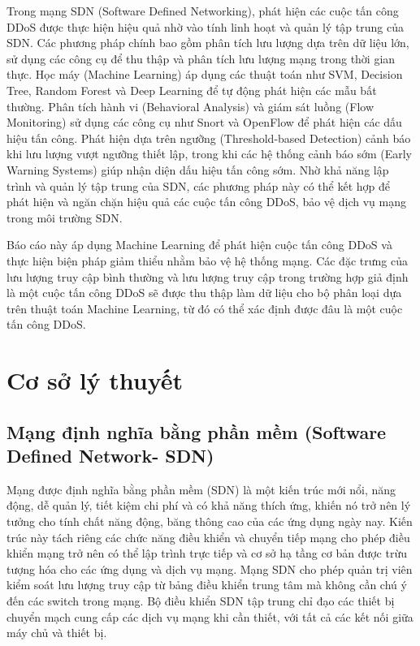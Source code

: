 \documentclass[a4paper]{article}
\begin{document}
Trong mạng SDN (Software Defined Networking), phát hiện các cuộc tấn công DDoS được thực hiện hiệu quả nhờ vào tính linh hoạt và quản lý tập trung của SDN. Các phương pháp chính bao gồm phân tích lưu lượng dựa trên dữ liệu lớn, sử dụng các công cụ để thu thập và phân tích lưu lượng mạng trong thời gian thực. Học máy (Machine Learning) áp dụng các thuật toán như SVM, Decision Tree, Random Forest và Deep Learning để tự động phát hiện các mẫu bất thường. Phân tích hành vi (Behavioral Analysis) và giám sát luồng (Flow Monitoring) sử dụng các công cụ như Snort và OpenFlow để phát hiện các dấu hiệu tấn công. Phát hiện dựa trên ngưỡng (Threshold-based Detection\cite{halman2024threshold}) cảnh báo khi lưu lượng vượt ngưỡng thiết lập, trong khi các hệ thống cảnh báo sớm (Early Warning Systems) giúp nhận diện dấu hiệu tấn công sớm. Nhờ khả năng lập trình và quản lý tập trung của SDN, các phương pháp này có thể kết hợp để phát hiện và ngăn chặn hiệu quả các cuộc tấn công DDoS, bảo vệ dịch vụ mạng trong môi trường SDN.

Báo cáo này áp dụng Machine Learning để phát hiện cuộc tấn công DDoS và thực hiện biện pháp giảm thiểu nhằm bảo vệ hệ thống mạng. Các đặc trưng của lưu lượng truy cập bình thường và lưu lượng truy cập trong trường hợp giả định là một cuộc tấn công DDoS sẽ được thu thập làm dữ liệu cho bộ phân loại dựa trên thuật toán Machine Learning, từ đó có thể xác định được đâu là một cuộc tấn công DDoS.

\newpage
\section{Cơ sở lý thuyết}
\subsection{Mạng định nghĩa bằng phần mềm (Software Defined Network- SDN)}
Mạng được định nghĩa bằng phần mềm (SDN) là một kiến trúc mới nổi, năng động, dễ quản lý, tiết kiệm chi phí và có khả năng thích ứng, khiến nó trở nên lý tưởng cho tính chất năng động, băng thông cao của các ứng dụng ngày nay. Kiến trúc này tách riêng các chức năng điều khiển và chuyển tiếp mạng cho phép điều khiển mạng trở nên có thể lập trình trực tiếp và cơ sở hạ tầng cơ bản được trừu tượng hóa cho các ứng dụng và dịch vụ mạng.
Mạng SDN cho phép quản trị viên kiểm soát lưu lượng truy cập từ bảng điều khiển trung tâm mà không cần chú ý đến các switch trong mạng. Bộ điều khiển SDN tập trung chỉ đạo các thiết bị chuyển mạch cung cấp các dịch vụ mạng khi cần thiết, với tất cả các kết nối giữa máy chủ và thiết bị.
\end{document}
